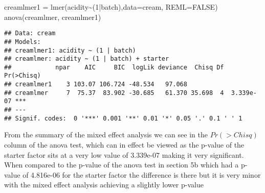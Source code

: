 \documentclass[
]{article}
\newenvironment{Shaded}{\begin{snugshade}}{\end{snugshade}}
\newcommand{\AttributeTok}[1]{\textcolor[rgb]{0.77,0.63,0.00}{#1}}
\newcommand{\ConstantTok}[1]{\textcolor[rgb]{0.00,0.00,0.00}{#1}}
\newcommand{\DecValTok}[1]{\textcolor[rgb]{0.00,0.00,0.81}{#1}}
\newcommand{\FunctionTok}[1]{\textcolor[rgb]{0.00,0.00,0.00}{#1}}
\newcommand{\NormalTok}[1]{#1}
\newcommand{\OtherTok}[1]{\textcolor[rgb]{0.56,0.35,0.01}{#1}}
\newcommand{\SpecialCharTok}[1]{\textcolor[rgb]{0.00,0.00,0.00}{#1}}
\begin{document}
\begin{Shaded}
\begin{Highlighting}[]
\NormalTok{creamlmer1 }\OtherTok{=} \FunctionTok{lmer}\NormalTok{(acidity}\SpecialCharTok{\textasciitilde{}}\NormalTok{(}\DecValTok{1}\SpecialCharTok{|}\NormalTok{batch),}\AttributeTok{data=}\NormalTok{cream, }\AttributeTok{REML=}\ConstantTok{FALSE}\NormalTok{)}
\FunctionTok{anova}\NormalTok{(creamlmer, creamlmer1)}
\end{Highlighting}
\end{Shaded}

\begin{verbatim}
## Data: cream
## Models:
## creamlmer1: acidity ~ (1 | batch)
## creamlmer: acidity ~ (1 | batch) + starter
##            npar    AIC     BIC  logLik deviance  Chisq Df Pr(>Chisq)    
## creamlmer1    3 103.07 106.724 -48.534   97.068                         
## creamlmer     7  75.37  83.902 -30.685   61.370 35.698  4  3.339e-07 ***
## ---
## Signif. codes:  0 '***' 0.001 '**' 0.01 '*' 0.05 '.' 0.1 ' ' 1
\end{verbatim}

From the summary of the mixed effect analysis we can see in the
\(Pr(>Chisq)\) column of the anova test, which can in effect be viewed
as the p-value of the starter factor sits at a very low value of
3.339e-07 making it very significant. When compared to the p-value of
the anova test in section 5b which had a p-value of 4.816e-06 for the
starter factor the difference is there but it is very minor with the
mixed effect analysis achieving a slightly lower p-value
\end{document}
